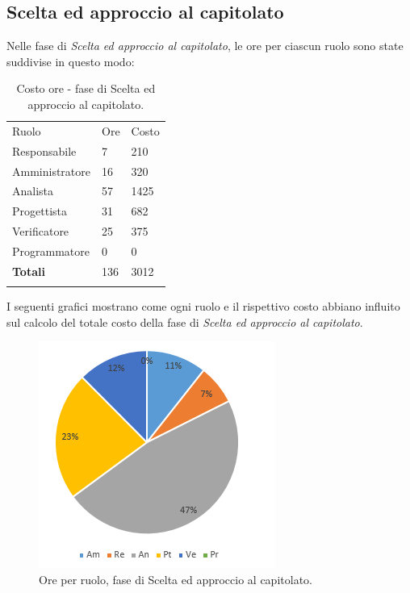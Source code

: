 \documentclass[a4paper]{article}
\begin{document}
		\subsection{Scelta ed approccio al capitolato}
			Nelle fase di \emph{Scelta ed approccio al capitolato}, le ore per ciascun ruolo sono state suddivise in questo modo:
			\begin{table}[H]
				\begin{tabularx}{\textwidth}{Y Y Y}
					Ruolo & Ore & Costo \\
					Responsabile & 7 & 210 \\
					Amministratore & 16 & 320 \\
					Analista & 57 & 1425\\
					Progettista & 31 & 682\\
					Verificatore & 25 & 375\\
					Programmatore & 0 & 0 \\
					\textbf{Totali} & 136 & 3012 \\
				\end{tabularx}
				\caption{Costo ore - fase di Scelta ed approccio al capitolato. } 
				\label{TCAnalisi}
			\end{table}
			I seguenti grafici mostrano come ogni ruolo e il rispettivo costo abbiano influito sul calcolo del totale 
			costo della fase di \emph{Scelta ed approccio al capitolato}.
			\begin{figure}[H]
				\centering
				\includegraphics[scale=0.7]{pc_approccio}
				\caption{Ore per ruolo, fase di Scelta ed approccio al capitolato.}
			\end{figure}
\end{document}
